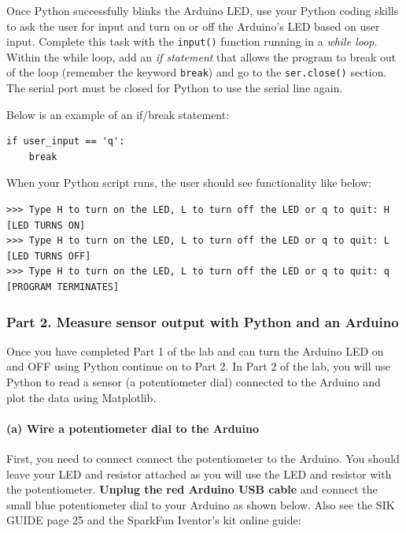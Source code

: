 \documentclass[11pt]{article}
\begin{document}
Once Python successfully blinks the Arduino LED, use your Python coding
skills to ask the user for input and turn on or off the Arduino's LED
based on user input. Complete this task with the \texttt{input()}
function running in a \emph{while loop}. Within the while loop, add an
\emph{if statement} that allows the program to break out of the loop
(remember the keyword \texttt{break}) and go to the \texttt{ser.close()}
section. The serial port must be closed for Python to use the serial
line again.

Below is an example of an if/break statement:

\begin{verbatim}
if user_input == 'q':
    break 
\end{verbatim}

When your Python script runs, the user should see functionality like
below:

\begin{verbatim}
>>> Type H to turn on the LED, L to turn off the LED or q to quit: H
[LED TURNS ON]
>>> Type H to turn on the LED, L to turn off the LED or q to quit: L
[LED TURNS OFF]
>>> Type H to turn on the LED, L to turn off the LED or q to quit: q
[PROGRAM TERMINATES]
\end{verbatim}

    \hypertarget{part-2.-measure-sensor-output-with-python-and-an-arduino}{%
\subsubsection{Part 2. Measure sensor output with Python and an
Arduino}\label{part-2.-measure-sensor-output-with-python-and-an-arduino}}

Once you have completed Part 1 of the lab and can turn the Arduino LED
on and OFF using Python continue on to Part 2. In Part 2 of the lab, you
will use Python to read a sensor (a potentiometer dial) connected to the
Arduino and plot the data using Matplotlib.

    \hypertarget{a-wire-a-potentiometer-dial-to-the-arduino}{%
\paragraph{(a) Wire a potentiometer dial to the
Arduino}\label{a-wire-a-potentiometer-dial-to-the-arduino}}

First, you need to connect connect the potentiometer to the Arduino. You
should leave your LED and resistor attached as you will use the LED and
resistor with the potentiometer. \textbf{Unplug the red Arduino USB
cable} and connect the small blue potentiometer dial to your Arduino as
shown below. Also see the SIK GUIDE page 25 and the SparkFun Iventor's
kit online guide:
\end{document}
